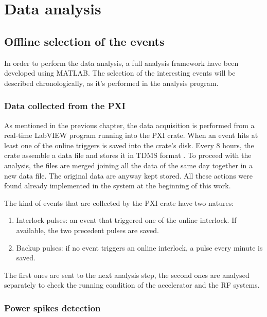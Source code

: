 \chapter[Data analysis]{Data analysis}

\section[Offline selection of the events]{Offline selection of the events}

In order to perform the data analysis, a full analysis framework have been developed using MATLAB. The selection of the interesting events will be described chronologically, as it's performed in the analysis program.

\subsection[Data collected from the PXI]{Data collected from the PXI}

As mentioned in the previous chapter, the data acquisition is performed from a real-time LabVIEW program running into the PXI crate. When an event hits at least one of the online triggers is saved into the crate's disk. Every 8 hours, the crate assemble a data file and stores it in TDMS format \cite{NI:TDMS}. To proceed with the analysis, the files are merged joining all the data of the same day together in a new data file. The original data are anyway kept stored. All these actions were found already implemented in the system at the beginning of this work.

The kind of events that are collected by the PXI crate have two natures:
\begin{enumerate}
\item Interlock pulses: an event that triggered one of the online interlock. If available, the two precedent pulses are saved.
\item Backup pulses: if no event triggers an online interlock, a pulse every minute is saved.
\end{enumerate}
The first ones are sent to the next analysis step, the second ones are analysed separately to check the running condition of the accelerator and the RF systems.


\subsection[Power spikes detection]{Power spikes detection}

